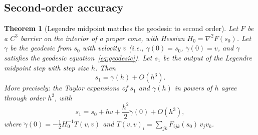 \documentclass[11pt]{article}
\newtheorem{theorem}{Theorem}
\begin{document}
\subsection{Second-order accuracy}
\label{sec:legendre-proof}

\begin{theorem}[Legendre midpoint matches the geodesic to second order]
\label{thm:legendre-second-order}
Let $F$ be a $C^3$ barrier on the interior of a proper cone, with
Hessian $H_0 = \nabla^2 F(s_0)$.  Let $\gamma$ be the geodesic
from $s_0$ with velocity $v$ (i.e., $\gamma(0) = s_0$,
$\dot\gamma(0) = v$, and $\gamma$ satisfies the geodesic
equation~\eqref{eq:geodesic}).  Let $s_1$ be the output of the
Legendre midpoint step with step size $h$.  Then
\[
  s_1 = \gamma(h) + O(h^3).
\]
More precisely: the Taylor expansions of $s_1$ and $\gamma(h)$
in powers of $h$ agree through order $h^2$, with
\[
  s_1 = s_0 + hv + \frac{h^2}{2}\ddot\gamma(0) + O(h^3),
\]
where $\ddot\gamma(0) = -\frac{1}{2}H_0^{-1}T(v,v)$ and
$T(v,v)_i = \sum_{jk} F_{ijk}(s_0)\, v_j v_k$.
\end{theorem}
\end{document}
